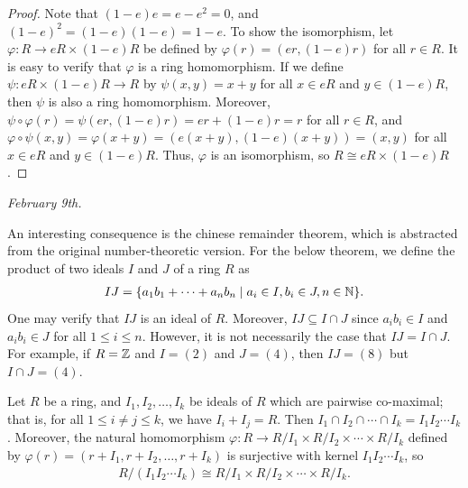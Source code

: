 \begin{proof}
    Note that $(1-e)e = e-e^{2} = 0$, and $(1-e)^{2} = (1-e)(1-e) = 1-e$. To show the isomorphism, let $\varphi : R \to eR \times (1-e)R$ be defined by $\varphi(r) = (er, (1-e)r)$ for all $r \in R$. It is easy to verify that $\varphi$ is a ring homomorphism. If we define $\psi : eR \times (1-e)R \to R$ by $\psi(x,y) = x + y$ for all $x \in eR$ and $y \in (1-e)R$, then $\psi$ is also a ring homomorphism. Moreover, $\psi \circ \varphi(r) = \psi(er, (1-e)r) = er + (1-e)r = r$ for all $r \in R$, and $\varphi \circ \psi(x,y) = \varphi(x+y) = (e(x+y), (1-e)(x+y)) = (x,y)$ for all $x \in eR$ and $y \in (1-e)R$. Thus, $\varphi$ is an isomorphism, so $R \cong eR \times (1-e)R$.
\end{proof}

\noindent \textit{February 9th.}

An interesting consequence is the chinese remainder theorem, which is abstracted from the original number-theoretic version. For the below theorem, we define the product of two ideals $I$ and $J$ of a ring $R$ as
\begin{align}
    IJ = \{a_{1}b_{1} + \cdots + a_{n}b_{n} \mid a_{i} \in I, b_{i} \in J, n \in \mathbb{N}\}.
\end{align}
One may verify that $IJ$ is an ideal of $R$. Moreover, $IJ \subseteq I \cap J$ since $a_{i}b_{i} \in I$ and $a_{i}b_{i} \in J$ for all $1 \leq i \leq n$. However, it is not necessarily the case that $IJ = I \cap J$. For example, if $R = \mathbb{Z}$ and $I = (2)$ and $J = (4)$, then $IJ = (8)$ but $I \cap J = (4)$. 

\begin{theorem}
    Let $R$ be a ring, and $I_{1}, I_{2}, \ldots, I_{k}$ be ideals of $R$ which are pairwise co-maximal; that is, for all $1 \leq i \neq j \leq k$, we have $I_{i} + I_{j} = R$. Then $I_{1} \cap I_{2} \cap \cdots \cap I_{k} = I_{1} I_{2} \cdots I_{k}$. Moreover, the natural homomorphism $\varphi : R \to R/I_{1} \times R/I_{2} \times \cdots \times R/I_{k}$ defined by $\varphi(r) = (r + I_{1}, r + I_{2}, \ldots, r + I_{k})$ is surjective with kernel $I_{1} I_{2} \cdots I_{k}$, so
    \begin{align}
        R/(I_{1} I_{2} \cdots I_{k}) \cong R/I_{1} \times R/I_{2} \times \cdots \times R/I_{k}.
    \end{align}
\end{theorem}

